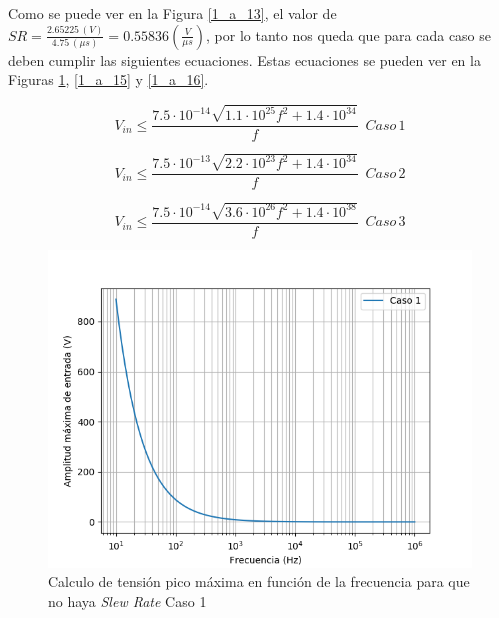 Como se puede ver en la Figura \ref{1_a_13}, el valor de $SR=\frac{2.65225\,(V)}{4.75\,(\mu s)}=0.55836\left(\frac{V}{\mu s}\right)$,
por lo tanto nos queda que para cada caso se deben cumplir las siguientes
ecuaciones. Estas ecuaciones se pueden ver en la Figuras \ref{1_a_4},
\ref{1_a_15} y \ref{1_a_16}.

\[
V_{in}\leq\frac{7.5\cdot10^{-14}\sqrt{1.1\cdot10^{25}f^{2}+1.4\cdot10^{34}}}{f}\,\,\,Caso\,1
\]

\[
V_{in}\leq\frac{7.5\cdot10^{-13}\sqrt{2.2\cdot10^{23}f^{2}+1.4\cdot10^{34}}}{f}\,\,\,Caso\,2
\]

\[
V_{in}\leq\frac{7.5\cdot10^{-14}\sqrt{3.6\cdot10^{26}f^{2}+1.4\cdot10^{38}}}{f}\,\,\,Caso\,3
\]

\begin{figure}[H]
\begin{centering}
\includegraphics[scale=0.5]{../Ex1/iA/Resources1a/SlewRate1}
\par\end{centering}
\caption{Calculo de tensión pico máxima en función de la frecuencia para que
no haya \emph{Slew Rate} Caso 1}
\label{1_a_4}

\end{figure}

